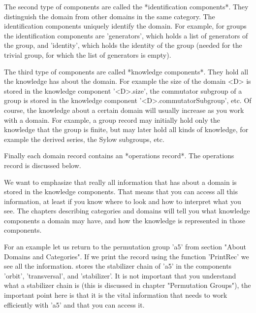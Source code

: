 The second type of components are called the *identification components*.
They distinguish the domain from other domains in the same category.  The
identification components uniquely identify the domain.  For example, for
groups the identification components are 'generators', which holds a list
of generators  of the group, and 'identity', which  holds the identity of
the group (needed for the trivial group, for which the list of generators
is empty).

The third type of  components are called *knowledge   components*.   They
hold all the knowledge {\GAP} has about the domain.  For example the size
of the domain <D>  is  stored in the  knowledge component '<D>.size', the
commutator subgroup of  a  group is stored   in  the  knowledge component
'<D>.commutatorSubgroup', etc.  Of  course, the knowledge about a certain
domain will usually increase as you  work with a domain.  For  example, a
group record may  initially hold  only the knowledge  that the  group  is
finite,  but may  later hold all   kinds  of knowledge, for  example  the
derived series, the Sylow subgroups, etc.

Finally  each  domain  record  contains   an *operations  record*.    The
operations record is discussed below.

We want to  emphasize that really all information that {\GAP} has about a
domain is stored  in  the knowledge components.  That  means that you can
access all this information, at least if you know  where to  look and how
to  interpret  what you see.   The  chapters  describing  categories  and
domains  will tell you  what  knowledge components a domain may have, and
how the knowledge is represented in those components.

For an example let us return  to the permutation group 'a5' from  section
"About  Domains  and  Categories".   If  we print  the  record  using the
function  'PrintRec'  we  see all the  information.   {\GAP}  stores  the
stabilizer chain of  'a5' in the  components 'orbit',  'transversal', and
'stabilizer'.  It is not important that you understand what  a stabilizer
chain  is  (this  is  discussed  in  chapter "Permutation  Groups"),  the
important  point here  is that it  is the  vital  information that {\GAP}
needs to work efficiently with 'a5' and that you can access it.

